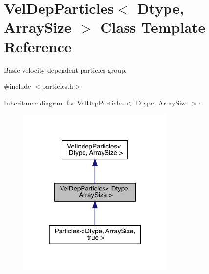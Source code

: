\hypertarget{class_vel_dep_particles}{}\section{Vel\+Dep\+Particles$<$ Dtype, Array\+Size $>$ Class Template Reference}
\label{class_vel_dep_particles}


Basic velocity dependent particles group.  




{\ttfamily \#include $<$particles.\+h$>$}



Inheritance diagram for Vel\+Dep\+Particles$<$ Dtype, Array\+Size $>$\+:\nopagebreak
\begin{figure}[H]
\begin{center}
\leavevmode
\includegraphics[width=220pt]{class_vel_dep_particles__inherit__graph}
\end{center}
\end{figure}


